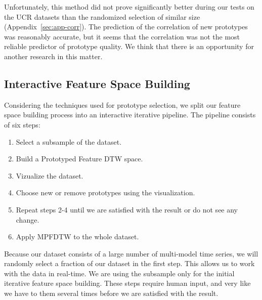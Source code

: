 Unfortunately, this method did not prove significantly better during our tests on the UCR datasets than the randomized selection of similar size (Appendix~\ref{sec:app-corr}). The prediction of the correlation of new prototypes was reasonably accurate, but it seems that the correlation was not the most reliable predictor of prototype quality. We think that there is an opportunity for another research in this matter.

\subsection{Interactive Feature Space Building}
Considering the techniques used for prototype selection, we split our feature space building process into an interactive iterative pipeline. The pipeline consists of six steps:
\begin{enumerate}
    \item Select a subsample of the dataset.
    \item Build a Prototyped Feature DTW space.
    \item Vizualize the dataset.
    \item Choose new or remove prototypes using the visualization.
    \item Repeat steps 2-4 until we are satisfied with the result or do not see any change.
    \item Apply MPFDTW to the whole dataset.
\end{enumerate}

Because our dataset consists of a large number of multi-model time series, we will randomly select a fraction of our dataset in the first step. This allows us to work with the data in real-time. We are using the subsample only for the initial iterative feature space building. These steps require human input, and very like we have to them several times before we are satisfied with the result.


